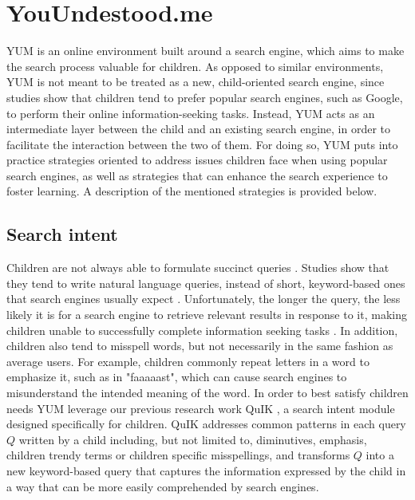 \documentclass{sig-alternate-05-2015}
\begin{document}
\section{YouUndestood.me}
YUM is an online environment built around a search engine, which aims to make the search process valuable for children. As opposed to similar environments\cite{Ust14}, YUM is not meant to be treated as a new, child-oriented search engine, since studies \cite{Bil13} show that children tend to prefer popular search engines, such as Google, to perform their online information-seeking tasks. Instead, YUM acts as an intermediate layer between the child and an existing search engine, in order to facilitate the interaction between the two of them. For doing so, YUM puts into practice strategies oriented to address issues children face when using popular search engines, as well as strategies that can enhance the search experience to foster learning.  A description of the mentioned strategies is provided below.

\subsection{Search intent}
Children are not always able to formulate succinct queries \cite{Bil11}. Studies show that they tend to write natural language queries, instead of short, keyword-based ones that search engines usually expect \cite{Dru09}. Unfortunately, the longer the query, the less likely it is for a  search engine to retrieve relevant results in response to it, making children unable to successfully complete information seeking tasks \cite{Dru09}. In addition, children also tend to misspell words, but not necessarily in the same fashion as average users. For example, children commonly repeat letters in a word to emphasize it, such as in "faaaaast", which can cause search engines to misunderstand the intended meaning of the word. In order to best satisfy children needs YUM leverage our previous research work QuIK \cite{Quik}, a search intent module designed specifically  for children. QuIK addresses common patterns in each query $Q$ written by a child including, but not limited to, diminutives, emphasis, children trendy terms or children specific misspellings, and transforms $Q$ into a new keyword-based query that captures the information expressed by the child in a way that can be more easily comprehended by search engines.
\end{document}
